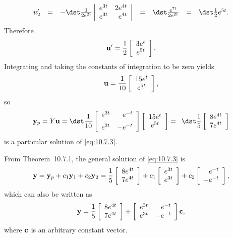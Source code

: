 \begin{examplesolution}
\[\begin{array}{ccccccl}
    u_{2}' & = & -\dst\frac{1}{2e^{2t}} \left|\begin{array}{rr}e^{3t}&2e^{4t}\\e^{3t}&e^{4t}\end{array}\right|  & = & \dst\frac{e^{7t}}{2e^{2t}}  & = & \dst\frac{1}{2}e^{5t}.
  \end{array}
\]
Therefore
\[
  {\bf u}'=\frac{1}{2}\left[
  \begin{array}{c}
    3e^{t} \\
    e^{5t}
  \end{array}\right].
\]
Integrating and taking the constants of integration to be zero yields
\[
  {\bf u}=\frac{1}{10}\left[
  \begin{array}{c}
    15e^{t} \\
    e^{5t}
  \end{array}\right],
\]
so
\[
  {\bf y}_{p}=Y{\bf u}= \dst\frac{1}{10}\left[
  \begin{array}{rr}
    e^{3t} & e^{-t}  \\[2\jot]
    e^{3t} & -e^{-t}
  \end{array}\right] \left[
  \begin{array}{c}
    15e^{t} \\
    e^{5t}
  \end{array}\right] =\phantom{0}\dst\frac{1}{5}\left[
  \begin{array}{c}
    8e^{4t} \\
    7e^{4t}
  \end{array}\right]
\]
is a particular solution of \eqref{eq:10.7.3}.

 From Theorem~10.7.1, the general solution of \eqref{eq:10.7.3} is
\begin{equation}
  \label{eq:10.7.5}{\bf y}={\bf y}_{p}+c_{1}{\bf y}_{1}+c_{2}{\bf y}_{2}= \frac{1}{5}\left[
  \begin{array}{c}
    8e^{4t} \\
    7e^{4t}
  \end{array}\right] +c_{1}\left[
  \begin{array}{r}
    e^{3t} \\
    e^{3t}
  \end{array}\right] +c_{2}\left[
  \begin{array}{r}
    e^{-t}  \\
    -e^{-t}
  \end{array}\right],
\end{equation}
which can also be written as
\[
  {\bf y}= \frac{1}{5}\left[
  \begin{array}{c}
    8e^{4t} \\
    7e^{4t}
  \end{array}\right] +\left[
  \begin{array}{rr}
    e^{3t} & e^{-t}  \\
    e^{3t} & -e^{-t}
  \end{array}\right]{\bf c},
\]
where ${\bf c}$ is an arbitrary constant vector.


\end{examplesolution}
